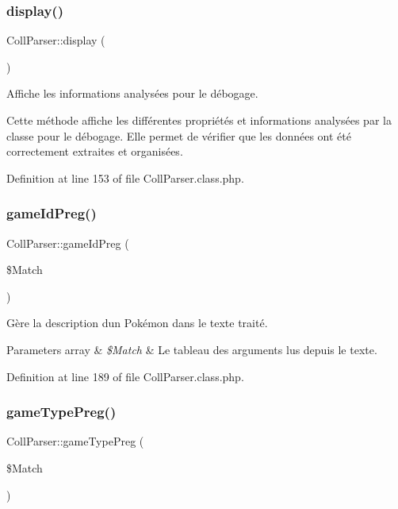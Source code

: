 \subsubsection{\texorpdfstring{display()}{display()}}
{\footnotesize\ttfamily Coll\+Parser\+::display (\begin{DoxyParamCaption}{ }\end{DoxyParamCaption})}

Affiche les informations analysées pour le débogage.

Cette méthode affiche les différentes propriétés et informations analysées par la classe pour le débogage. Elle permet de vérifier que les données ont été correctement extraites et organisées. 

Definition at line 153 of file Coll\+Parser.\+class.\+php.

\mbox{\label{class_coll_parser_a89a255cb6842c7992021a47fea2f8303}} 
\subsubsection{\texorpdfstring{game\+Id\+Preg()}{gameIdPreg()}}
{\footnotesize\ttfamily Coll\+Parser\+::game\+Id\+Preg (\begin{DoxyParamCaption}\item[{}]{\$\+Match }\end{DoxyParamCaption})\hspace{0.3cm}{\ttfamily [protected]}}

Gère la description d\textquotesingle{}un Pokémon dans le texte traité.


\begin{DoxyParams}[1]{Parameters}
array & {\em \$\+Match} & Le tableau des arguments lus depuis le texte. \\
\hline
\end{DoxyParams}


Definition at line 189 of file Coll\+Parser.\+class.\+php.

\mbox{\label{class_coll_parser_aa30643c8dbda4c34c0fdeaf1018c620a}} 
\subsubsection{\texorpdfstring{game\+Type\+Preg()}{gameTypePreg()}}
{\footnotesize\ttfamily Coll\+Parser\+::game\+Type\+Preg (\begin{DoxyParamCaption}\item[{}]{\$\+Match }\end{DoxyParamCaption})\hspace{0.3cm}{\ttfamily [protected]}}


